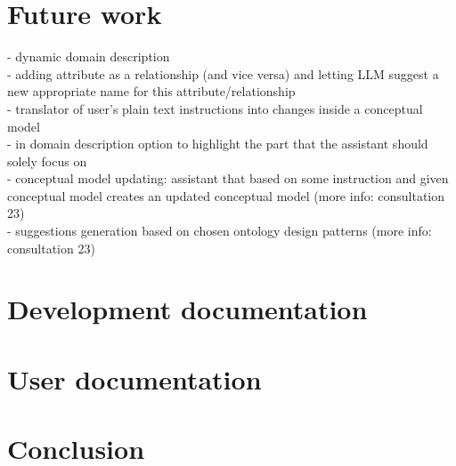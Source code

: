 \chapter{Future work}

- dynamic domain description \\

- adding attribute as a relationship (and vice versa) and letting LLM suggest a new appropriate name for this attribute/relationship \\

- translator of user's plain text instructions into changes inside a conceptual model \\

- in domain description option to highlight the part that the assistant should solely focus on \\

- conceptual model updating: assistant that based on some instruction and given conceptual model creates an updated conceptual model (more info: consultation 23) \\

- suggestions generation based on chosen ontology design patterns (more info: consultation 23) \\

\chapter{Development documentation}
\chapter{User documentation}
\chapter{Conclusion}